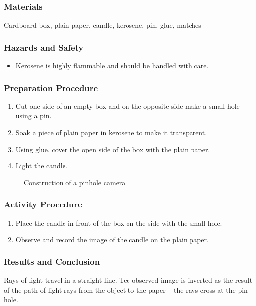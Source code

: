 \subsubsection*{Materials}
Cardboard box, plain paper, candle, kerosene, pin, glue, matches

\subsubsection*{Hazards and Safety}
\begin{itemize}
\item{Kerosene is highly flammable and should be handled with care.} 
\end{itemize}

\subsubsection*{Preparation Procedure}
\begin{enumerate}
\item{Cut one side of an empty box and on the opposite side make a small hole using a pin.} 
\item{Soak a piece of plain paper in kerosene to make it transparent.} 
\item{Using glue, cover the open side of the box with the plain paper.} 
\item{Light the candle.} 
\end{enumerate}

\begin{figure}
\begin{center}
\def\svgwidth{2cm}

\caption{Construction of a pinhole camera}
\label{fig:pinhole-camera}
\end{center}
\end{figure}

\subsubsection*{Activity Procedure}
\begin{enumerate}
\item{Place the candle in front of the box on the side with the small hole.} 
\item{Observe and record the image of the candle on the plain paper.} 
\end{enumerate}

\subsubsection*{Results and Conclusion}
Rays of light travel in a straight line. Tee observed image is inverted as the result of the path of light rays from the object to the paper -- the rays cross at the pin hole.

